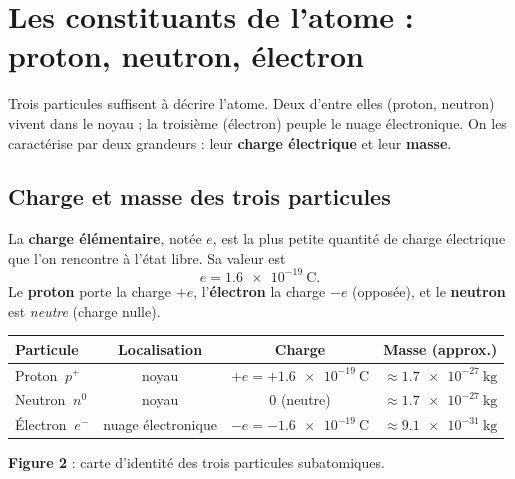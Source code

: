 \documentclass[11pt,a4paper]{article}
\newcommand{\pp}{p^{+}}      %
\newcommand{\ee}{e^{-}}      %
\newcommand{\nz}{n^{0}}      %
\begin{document}
\section{Les constituants de l'atome : proton, neutron, électron}
Trois particules suffisent à décrire l'atome. Deux d'entre elles (proton, neutron) vivent dans le
noyau ; la troisième (électron) peuple le nuage électronique. On les caractérise par deux grandeurs :
leur \textbf{charge électrique} et leur \textbf{masse}.

\subsection{Charge et masse des trois particules}

\begin{definition}
La \textbf{charge élémentaire}, notée \(e\), est la plus petite quantité de charge électrique que l'on
rencontre à l'état libre. Sa valeur est
\[ e = \SI{1,6e-19}{\coulomb}. \]
Le \textbf{proton} porte la charge \(+e\), l'\textbf{électron} la charge \(-e\) (opposée), et le
\textbf{neutron} est \emph{neutre} (charge nulle).
\end{definition}

\begin{center}
\renewcommand{\arraystretch}{1.35}
\begin{tabular}{l c c c}
\rowcolor{primary!18}
\textbf{Particule} & \textbf{Localisation} & \textbf{Charge} & \textbf{Masse (approx.)} \\
\midrule
\rowcolor{primary!4}
Proton $\ \pp$   & noyau            & $+e = +\SI{1,6e-19}{\coulomb}$ & $\approx \SI{1,7e-27}{\kilo\gram}$ \\
Neutron $\ \nz$  & noyau            & $0$ (neutre)                   & $\approx \SI{1,7e-27}{\kilo\gram}$ \\
\rowcolor{primary!4}
Électron $\ \ee$ & nuage électronique & $-e = -\SI{1,6e-19}{\coulomb}$ & $\approx \SI{9,1e-31}{\kilo\gram}$ \\
\bottomrule
\end{tabular}
\end{center}
\vspace{-0.3em}
\begin{center}\small\textbf{\textcolor{primary}{Figure 2}} : carte d'identité des trois particules subatomiques.\end{center}
\end{document}
